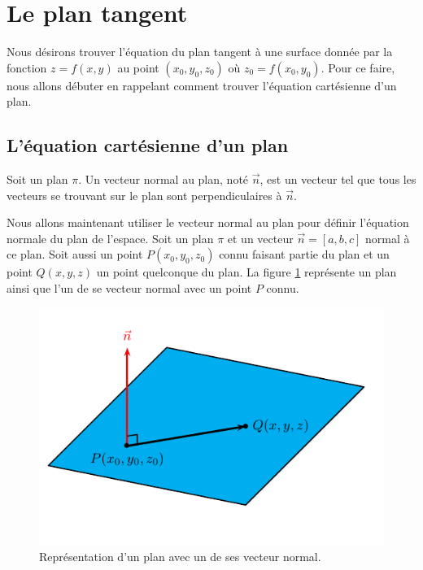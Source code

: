 \documentclass[]{book}
\theoremstyle{definition}
\theoremstyle{definition}
\theoremstyle{definition}
\theoremstyle{remark}
\let\BeginKnitrBlock\begin \let\EndKnitrBlock\end
\begin{document}
\hypertarget{le-plan-tangent}{%
\section{Le plan tangent}\label{le-plan-tangent}}

Nous désirons trouver l'équation du plan tangent à une surface donnée
par la fonction \(z=f(x,y)\) au point \((x_0,y_0,z_0)\) où
\(z_0=f(x_0,y_0)\). Pour ce faire, nous allons débuter en rappelant
comment trouver l'équation cartésienne d'un plan.

\hypertarget{lequation-cartesienne-dun-plan}{%
\subsection{L'équation cartésienne d'un
plan}\label{lequation-cartesienne-dun-plan}}

\BeginKnitrBlock{definition}[Le vecteur normal à un plan]
\protect\hypertarget{def:unnamed-chunk-169}{}{\label{def:unnamed-chunk-169}
{} }Soit un plan \(\pi\). Un
vecteur normal au plan, noté \(\vec n\), est un vecteur tel que tous les
vecteurs se trouvant sur le plan sont perpendiculaires à \(\vec n\).
\EndKnitrBlock{definition}

Nous allons maintenant utiliser le vecteur normal au plan pour définir
l'équation normale du plan de l'espace. Soit un plan \(\pi\) et un
vecteur \(\vec n=[a,b,c]\) normal à ce plan. Soit aussi un point
\(P(x_0,y_0,z_0)\) connu faisant partie du plan et un point \(Q(x,y,z)\)
un point quelconque du plan. La figure \ref{fig:eq-cartesienne-plan}
représente un plan ainsi que l'un de se vecteur normal avec un point
\(P\) connu.

\begin{figure}

{\centering \includegraphics[width=0.75\linewidth]{resources/images/latex/eqcartesienneplan} 

}

\caption{Représentation d'un plan avec un de ses vecteur normal.}\label{fig:eq-cartesienne-plan}
\end{figure}
\end{document}
